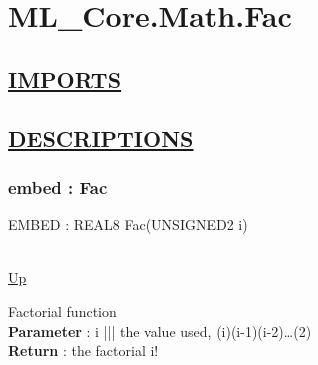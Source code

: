 \chapter*{ML\_Core.Math.Fac}
\hypertarget{ML_Core.Math.Fac}{}

\section*{\underline{IMPORTS}}

\section*{\underline{DESCRIPTIONS}}
\subsection*{embed : Fac}
\hypertarget{ecldoc:ml_core.math.fac}{EMBED : REAL8 Fac(UNSIGNED2 i)} \\
\hyperlink{ecldoc:}{Up} \\
\par
Factorial function \\
\textbf{Parameter} : i ||| the value used, (i)(i-1)(i-2)\ldots(2) \\
\textbf{Return} : the factorial i! \\
